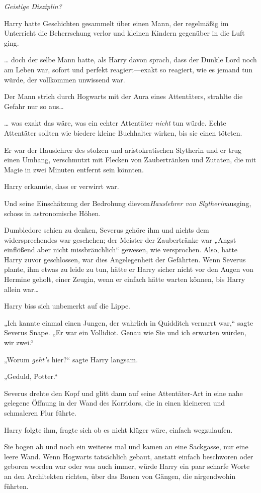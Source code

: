 {\emph{Geistige Disziplin?}

Harry hatte Geschichten gesammelt über einen Mann, der regelmäßig im Unterricht die Beherrschung verlor und kleinen Kindern gegenüber in die Luft ging.

… doch der selbe Mann hatte, als Harry davon sprach, dass der Dunkle Lord noch am Leben war, sofort und perfekt reagiert—exakt so reagiert, wie es jemand tun würde, der vollkommen unwissend war.

Der Mann strich durch Hogwarts mit der Aura eines Attentäters, strahlte die Gefahr nur so aus…

… was exakt das wäre, was ein echter Attentäter \emph{nicht} tun würde. Echte Attentäter sollten wie biedere kleine Buchhalter wirken, bis sie einen töteten.

Er war der Hauslehrer des stolzen und aristokratischen Slytherin und er trug einen Umhang, verschmutzt mit Flecken von Zaubertränken und Zutaten, die mit Magie in zwei Minuten entfernt sein könnten.

Harry erkannte, dass er verwirrt war.

Und seine Einschätzung der Bedrohung dievom\emph{Hauslehrer von Slytherin}ausging, schoss in astronomische Höhen.

Dumbledore schien zu denken, Severus gehöre ihm und nichts dem widersprechendes war geschehen; der Meister der Zaubertränke war „Angst einflößend aber nicht missbräuchlich“ gewesen, wie versprochen. Also, hatte Harry zuvor geschlossen, war dies Angelegenheit der Gefährten. Wenn Severus plante, ihm etwas zu leide zu tun, hätte er Harry sicher nicht vor den Augen von Hermine geholt, einer Zeugin, wenn er einfach hätte warten können, bis Harry allein war…

Harry biss sich unbemerkt auf die Lippe.

„Ich kannte einmal einen Jungen, der wahrlich in Quidditch vernarrt war,“ sagte Severus Snape. „Er war ein Vollidiot. Genau wie Sie und ich erwarten würden, wir zwei.“

„Worum \emph{geht's} hier?“ sagte Harry langsam.

„Geduld, Potter.“

Severus drehte den Kopf und glitt dann auf seine Attentäter-Art in eine nahe gelegene Öffnung in der Wand des Korridors, die in einen kleineren und schmaleren Flur führte.

Harry folgte ihm, fragte sich ob es nicht klüger wäre, einfach wegzulaufen.

Sie bogen ab und noch ein weiteres mal und kamen an eine Sackgasse, nur eine leere Wand. Wenn Hogwarts tatsächlich gebaut, anstatt einfach beschworen oder geboren worden war oder was auch immer, würde Harry ein paar scharfe Worte an den Architekten richten, über das Bauen von Gängen, die nirgendwohin führten.

}
